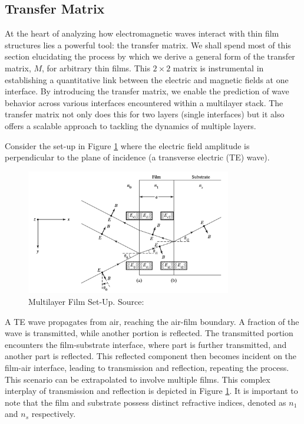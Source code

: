 \subsection{Transfer Matrix}

At the heart of analyzing how electromagnetic waves interact with thin film structures lies a powerful tool: the transfer matrix. We shall spend most of this section elucidating the process by which we derive a general form of the transfer matrix, $M$, for arbitrary thin films. This $2 \times 2$ matrix is instrumental in establishing a quantitative link between the electric and magnetic fields at one interface. By introducing the transfer matrix, we enable the prediction of wave behavior across various interfaces encountered within a multilayer stack. The transfer matrix not only does this for two layers (single interfaces) but it also offers a scalable approach to tackling the dynamics of multiple layers.

Consider the set-up in Figure \ref{Multilayer Film Set-Up} where the electric field amplitude is perpendicular to the plane of incidence (a transverse electric (TE) wave).
\begin{figure}[ht!]
  \centering
  \includegraphics[width=0.8\textwidth]{Chapters/Figures/Chapter 2 Figures/Multilayer Film Set-Up.png}
  \caption[Multilayer Film Set-Up]{Multilayer Film Set-Up. Source: \cite{pedrotti_introduction_2007}}
  \label{Multilayer Film Set-Up}
\end{figure}

A TE wave propagates from air, reaching the air-film boundary. A fraction of the wave is transmitted, while another portion is reflected. The transmitted portion encounters the film-substrate interface, where part is further transmitted, and another part is reflected. This reflected component then becomes incident on the film-air interface, leading to transmission and reflection, repeating the process. This scenario can be extrapolated to involve multiple films. This complex interplay of transmission and reflection is depicted in Figure \ref{Multilayer Film Set-Up}. It is important to note that the film and substrate possess distinct refractive indices, denoted as $n_1$ and $n_s$ respectively.

